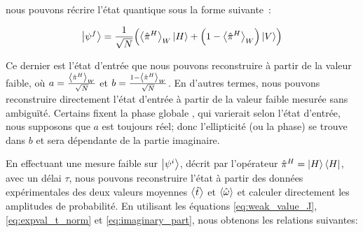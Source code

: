 \begin{onehalfspace}
    \noindent nous pouvons récrire l'état quantique sous la forme suivante :

    \begin{equation}
        \ket{\psi^{f}} = \frac{1}{\sqrt{N}}\Bigl(\expval{\hat{\pi}^{H}}_W\ket{H}+ \Bigl(1- \expval{\hat{\pi}^{H}}_W\Bigr)\ket{V}\Bigr)
    \end{equation}

    \noindent Ce dernier est l'état d'entrée que nous pouvons 
    reconstruire à partir de la valeur faible, où $a = \frac{\expval{\hat{\pi}^{H}}_W}{\sqrt{N}}$
    et $b = \frac{1-\expval{\hat{\pi}^{H}}_W}{\sqrt{N}}$. En d'autres termes, nous 
    pouvons reconstruire directement l'état d'entrée à partir de la valeur faible 
    mesurée sans ambiguïté. Certains fixent la phase globale \cite{Hairiri}, qui varierait selon l'état 
    d'entrée, nous supposons que $a$ est toujours réel; donc 
    l'ellipticité (ou la phase) se trouve dans $b$ et sera dépendante 
    de la partie imaginaire.
    
    \noindent En effectuant une mesure faible
    sur $\ket{\psi^{i}}$, décrit par l'opérateur $\hat{\pi}^{H} = \ket{H}\bra{H}$, 
    avec un délai $\tau$, nous pouvons reconstruire l'état à partir 
    des données expérimentales des deux 
    valeurs moyennes $\expval{\hat{t}}$ et $\expval{\hat{\omega}}$ et
    calculer directement les amplitudes de probabilité. 
    En utilisant les équations \eqref{eq:weak_value_J}, \eqref{eq:expval_t_norm}
    et \eqref{eq:imaginary_part}, nous obtenons les relations suivantes:





\end{onehalfspace}
